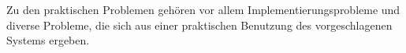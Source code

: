 Zu den praktischen Problemen gehören vor allem Implementierungsprobleme und diverse Probleme, die sich aus einer praktischen Benutzung des vorgeschlagenen Systems ergeben.
